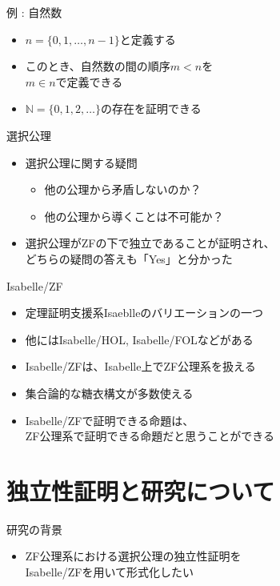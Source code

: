\documentclass[17pt,aspectratio=169,xcolor=dvipsnames,table,dvipdfmx]{beamer}
\theoremstyle{definition}
\begin{document}
\begin{frame} {例 : 自然数}
    \begin{itemize}
        \item $n = \{0, 1, \dots, n-1\}$と定義する
        \item このとき、自然数の間の順序$m < n$を\\$m \in n$で定義できる
        \item $\mathbb{N} = \{ 0, 1, 2, \dots \}$の存在を証明できる
    \end{itemize}
\end{frame}

\begin{frame} {選択公理}
    \begin{itemize}
        \item 選択公理に関する疑問
              \begin{itemize}
                  \item 他の公理から矛盾しないのか？
                  \item 他の公理から導くことは不可能か？
              \end{itemize}
        \item 選択公理がZFの下で独立であることが証明され、\\
              どちらの疑問の答えも「Yes」と分かった
    \end{itemize}
\end{frame}

\begin{frame} {Isabelle/ZF}
    \begin{itemize}
        \item 定理証明支援系Isaeblleのバリエーションの一つ
        \item 他にはIsabelle/HOL, Isabelle/FOLなどがある
        \item Isabelle/ZFは、Isabelle上でZF公理系を扱える
        \item 集合論的な糖衣構文が多数使える
        \item Isabelle/ZFで証明できる命題は、\\
              ZF公理系で証明できる命題だと思うことができる
    \end{itemize}
\end{frame}

\section{独立性証明と研究について}

\begin{frame} {研究の背景}
    \begin{itemize}
        \item ZF公理系における選択公理の独立性証明を\\Isabelle/ZFを用いて形式化したい
    \end{itemize}
\end{frame}
\end{document}
